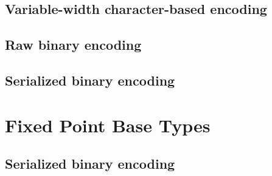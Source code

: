 \aedBegin{}
\aedEnd{}

\begin{tinycodeaux}{\leftmargin=0in}
\end{tinycodeaux}

\subsection{Variable-width character-based encoding}

\aedBegin{}
\aedEnd{}

\begin{tinycodeaux}{\leftmargin=0in}
\end{tinycodeaux}

\subsection{Raw binary encoding}

\bBegin{}
\bEnd{}

\begin{tinycodeaux}{\leftmargin=0in}
\end{tinycodeaux}

\subsection{Serialized binary encoding}

\sbBegin{}
\sbEnd{}

\begin{tinycodeaux}{\leftmargin=0in}
\end{tinycodeaux}

\section{Fixed Point Base Types}

\subsection{Serialized binary encoding}

\sbBegin{}
\bEnd{}

